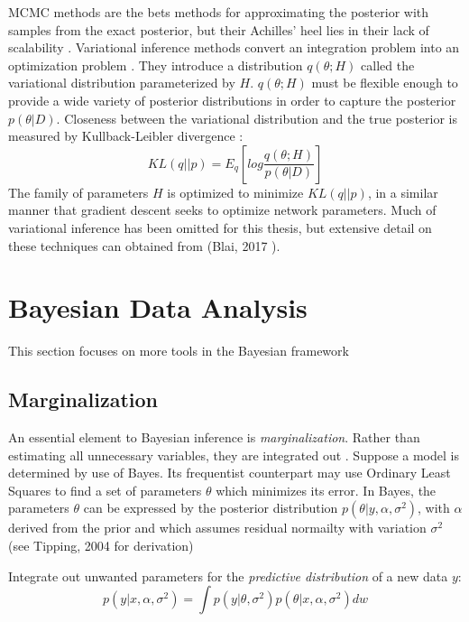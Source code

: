 MCMC methods are the bets methods for approximating the posterior with samples from the exact posterior, but their Achilles' heel lies in their lack of scalability \cite{Jospin}.  Variational inference methods convert an integration problem into an optimization problem \cite{mullachery2018bayesian}.  They introduce a distribution $q(\theta;H)$ called the variational distribution parameterized by $H$.  $q(\theta;H)$ must be flexible enough to provide a wide variety of posterior distributions in order to capture the posterior $p(\theta|D)$.  Closeness between the variational distribution and the true posterior is measured by Kullback-Leibler divergence \cite{blei2017variational}:
$$
KL(q||p) = E_q\left[ log\frac{q(\theta;H)}{p(\theta|D)} \right]
$$
The family of parameters $H$ is optimized to minimize $KL(q||p)$, in a similar manner that gradient descent seeks to optimize network parameters.  Much of variational inference has been omitted for this thesis, but extensive detail on these techniques can obtained from (Blai, 2017 \cite{blei2017variational}).


\section{Bayesian Data Analysis} %


This section focuses on more tools in the Bayesian framework

\subsection{Marginalization}

An essential element to Bayesian inference is \textit{marginalization}.  Rather than estimating all unnecessary variables, they are integrated out
\cite{tipping2004bayesian}.  Suppose a model is determined by use of Bayes.  Its frequentist counterpart may use Ordinary Least Squares to find a set of parameters $\theta$ which minimizes its error. In Bayes, the parameters $\theta$ can be expressed by the posterior distribution $p(\theta|y,\alpha,\sigma^2)$, with $\alpha$ derived from the prior and which assumes residual normailty with variation $\sigma^2$ (see Tipping, 2004 \cite{tipping2004bayesian} for derivation)

Integrate out unwanted parameters for the \textit{predictive distribution} of a new data $y$:
$$
p(y|x,\alpha,\sigma^2) = \int p(y|\theta,\sigma^2) p(\theta|x,\alpha,\sigma^2) dw
$$

